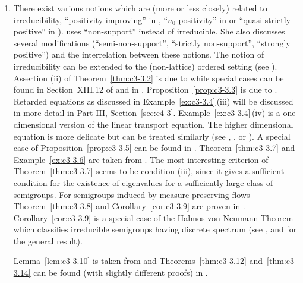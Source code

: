 \begin{enumerate}[label=\emph{Section \arabic*:}, wide, itemsep=1ex]
\item
There exist various notions which are (more or less closely) related to irreducibility, \eg \enquote{positivity improving} in \textcite{reedsimon:1979}, \enquote{$u_0$-positivity} in 
\textcite{krasnoselskii:1964} or \enquote{quasi-strictly positive} in \textcite{karlin:1959}). \textcite{sawashima:1964} uses \enquote{non-support} instead of irreducible. 
She also discusses several modifications (\enquote{semi-non-support}, \enquote{strictly non-support}, \enquote{strongly positive}) and the interrelation between these notions. 
The notion of irreducibility can be extended to the (non-lattice) ordered setting (see \textcite{battyrobinson:1984}). 
Assertion \upshape(ii) of Theorem~\ref{thm:c3-3.2} is due to \textcite{majewskirobinson:1983} while special cases can be found in Section~XIII.12 of \textcite{reedsimon:1979} and in \textcite{kishimotorobinson:1981}. 
Proposition~\ref{prop:c3-3.3} is due to \textcite{voigt:1984a}. 
Retarded equations as discussed in Example~\ref{ex:c3-3.4}\,(iii) will be discussed in more detail in 
Part-III, Section~\ref{sec:c4-3}.
Example~\ref{ex:c3-3.4}\,(iv) is a one-dimensional version of the linear transport equation. 
The higher dimensional equation is more delicate but can be treated similarly (see \eg \textcite{greiner:1984b}, \textcite{kaperetal:1983a}, or \textcite{voigt:1984b}). 
A special case of Proposition~\ref{prop:c3-3.5} can be found in \textcite{davies:1980}. 
Theorem~\ref{thm:c3-3.7} and Example~\ref{ex:c3-3.6} are taken from \textcite{schaefer:1985}. 
The most interesting criterion of Theorem~\ref{thm:c3-3.7} seems to be condition (iii), since it gives a sufficient condition for the existence of eigenvalues for a sufficiently large class of semigroups. 
For semigroups induced by measure-preserving flows Theorem~\ref{thm:c3-3.8} and Corollary~\ref{cor:c3-3.9} are proven in \textcite{cornfeldetal:1982}. 
Corollary~\ref{cor:c3-3.9} is a special case of the Halmos-von Neumann Theorem which classifies irreducible semigroups having discrete spectrum (see \textcite{cornfeldetal:1982}, \textcite{greiner:1982} and \textcite{schaefer:1974} for the general result). 

Lemma~\ref{lem:c3-3.10} is taken from \textcite{groh:1984b} and Theorems~\ref{thm:c3-3.12} and~\ref{thm:c3-3.14} can be found (with slightly different proofs) in \textcite{greiner:1981}. 


\end{enumerate}
